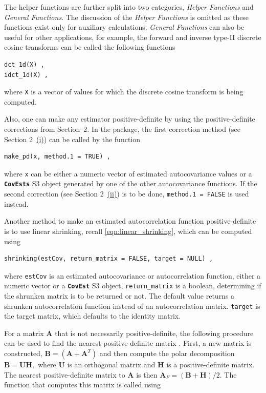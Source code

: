 The helper functions are further split into two categories, \emph{Helper
Functions} and \emph{General Functions}. The discussion of the
\emph{Helper Functions} is omitted as these functions exist only for
auxiliary calculations. \emph{General Functions} can also be useful for
other applications, for example, the forward and inverse type-II
discrete cosine transforms can be called the following functions

\begin{verbatim}
dct_1d(X) ,
idct_1d(X) ,
\end{verbatim}

where \texttt{X} is a vector of values for which the discrete cosine
transform is being computed.

Also, one can make any estimator positive-definite by using the
positive-definite corrections from Section~2. In the package, the first
correction method (see Section 2~\hyperref[make_pos_def_1]{(i)}) can be
called by the function

\begin{verbatim}
make_pd(x, method.1 = TRUE) ,
\end{verbatim}

where \texttt{x} can be either a numeric vector of estimated
autocovariance values or a \textbf{\texttt{CovEsts}} S3 object generated
by one of the other autocovariance functions. If the second correction
(see Section 2~\hyperref[make_pos_def_2]{(ii)}) is to be done,
\texttt{method.1\ =\ FALSE} is used instead.

Another method to make an estimated autocorrelation function
positive-definite is to use linear shrinking, recall
\eqref{eqn:linear_shrinking}, which can be computed using

\begin{verbatim}
shrinking(estCov, return_matrix = FALSE, target = NULL) ,
\end{verbatim}

where \texttt{estCov} is an estimated autocovariance or autocorrelation
function, either a numeric vector or a \textbf{\texttt{CovEst}} S3
object, \texttt{return\_matrix} is a boolean, determining if the
shrunken matrix is to be returned or not. The default value returns a
shrunken autocorrelation function instead of an autocorrelation matrix.
\texttt{target} is the target matrix, which defaults to the identity
matrix.

For a matrix \(\bm{A}\) that is not necessarily positive-definite, the
following procedure can be used to find the nearest positive-definite
matrix \cite[Th.~2.1]{Higham1988}. First, a new matrix is constructed,
\(\bm{B} = \left(\bm{A} + \bm{A}^{T} \right)\) and then compute the
polar decomposition \(\bm{B} = \bm{U} \bm{H},\) where \(\bm{U}\) is an
orthogonal matrix and \(\bm{H}\) is a positive-definite matrix. The
nearest positive-definite matrix to \(\bm{A}\) is then
\(\bm{A}_{F} = \left(\bm{B} + \bm{H}\right) / 2 .\) The function that
computes this matrix is called using

